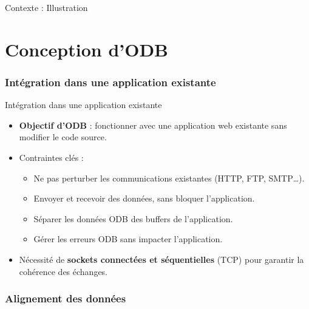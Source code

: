 \documentclass[aspectratio=43,8pt]{beamer}
\begin{document}
\begin{frame}{Contexte : Illustration}
\centering
{}
\end{frame}

\part{Conception d'ODB}

\section{Intégration dans une application existante}
\begin{frame}{Intégration dans une application existante}
\begin{itemize}
    \item \textbf{Objectif d'ODB} : fonctionner avec une application web existante sans modifier le code source.
    \item Contraintes clés :
    \begin{itemize}
        \item Ne pas perturber les communications existantes (HTTP, FTP, SMTP…).
        \item Envoyer et recevoir des données, sans bloquer l'application.
        \item Séparer les données ODB des buffers de l'application.
        \item Gérer les erreurs ODB sans impacter l'application.
    \end{itemize}
    \item Nécessité de \textbf{sockets connectées et séquentielles} (TCP) pour garantir la cohérence des échanges.
\end{itemize}
\end{frame}

\section{Alignement des données}
\end{document}
